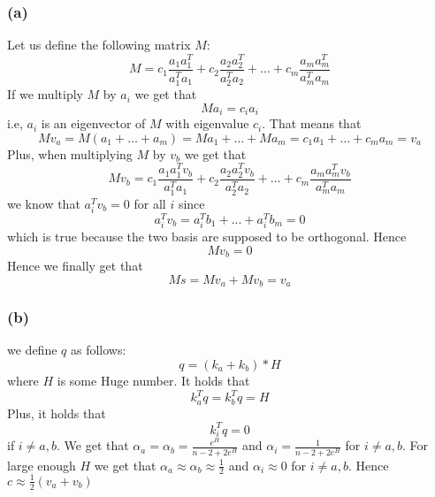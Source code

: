 \subsubsection*{(a)}
Let us define the following matrix $M$:
$$M=c_1 \frac{a_1 a_1^T}{a_1^T a_1} + c_2 \frac{a_2 a_2^T}{a_2^T a_2} + \dots + c_m \frac{a_m a_m^T}{a_m^T a_m}$$
If we multiply $M$ by $a_i$ we get that 
$$Ma_i = c_i a_i$$
i.e, $a_i$ is an eigenvector of $M$ with eigenvalue $c_i$. That means that 
$$Mv_a = M(a_1+ \dots + a_m) = Ma_1+ \dots + Ma_m=c_1a_1+ \dots +c_ma_m=v_a$$
Plus, when multiplying $M$ by $v_b$ we get that
$$Mv_b = c_1 \frac{a_1 a_1^T v_b}{a_1^T a_1} + c_2 \frac{a_2 a_2^T v_b}{a_2^T a_2} + \dots + c_m \frac{a_m a_m^T v_b}{a_m^T a_m}$$
we know that $a_i^T v_b = 0$ for all $i$ since 
$$a_i^T v_b = a_i^T b_1 + ... + a_i^T b_m = 0$$
which is true because the two basis are supposed to be orthogonal. Hence
$$Mv_b = 0$$
Hence we finally get that $$Ms=Mv_a+Mv_b=v_a$$ \newline
\subsubsection*{(b)}
we define $q$ as follows:
$$q = (k_a + k_b)*H$$ where $H$ is some Huge number. It holds that 
$$k_a^T q = k_b^T q = H$$
Plus, it holds that 
$$ k_i^T q = 0 $$ if $i \neq a,b$. We get that $\alpha_a = \alpha_b = \frac{e^H}{n-2 + 2e^H}$ and $\alpha_i=\frac{1}{n-2 + 2e^H}$ for $i \neq a,b$. \newline
For large enough $H$ we get that $\alpha_a \approx \alpha_b \approx \frac{1}{2}$ and $\alpha_i \approx 0$ for $i \neq a,b$. Hence $c \approx \frac{1}{2}(v_a + v_b)$